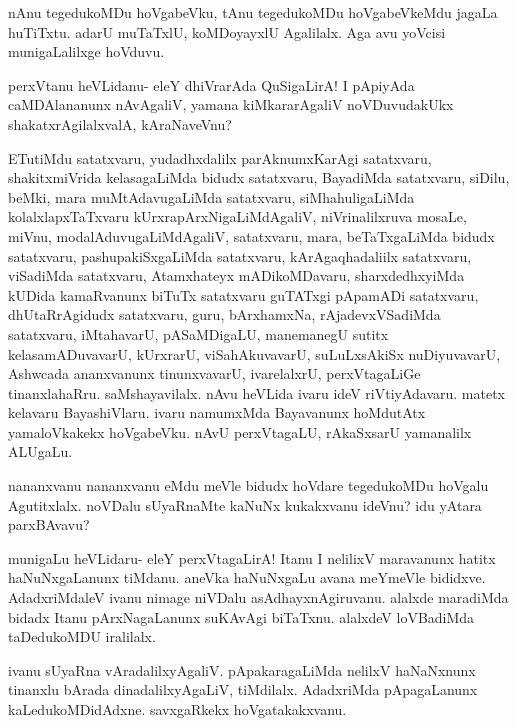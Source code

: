 \documentclass{article}
\begin{document}
\begin{mng}%
nAnu tegedukoMDu hoVgabeVku, tAnu tegedukoMDu hoVgabeVkeMdu jagaLa 
huTiTxtu. adarU muTaTxlU, koMDoyayxlU Agalilalx. Aga avu yoVcisi 
munigaLalilxge hoVduvu.
\end{mng}

\begin{mng}%
perxVtanu heVLidanu- eleY dhiVrarAda QuSigaLirA! I pApiyAda 
caMDAlananunx nAvAgaliV, yamana kiMkararAgaliV noVDuvudakUkx 
shakatxrAgilalxvalA, kAraNaveVnu?
\end{mng}

\begin{mng}%
ETutiMdu satatxvaru, yudadhxdalilx parAknumxKarAgi satatxvaru, 
shakitxmiVrida kelasagaLiMda bidudx satatxvaru, BayadiMda satatxvaru, 
siDilu, beMki, mara muMtAdavugaLiMda satatxvaru, siMhahuligaLiMda 
kolalxlapxTaTxvaru kUrxrapArxNigaLiMdAgaliV, niVrinalilxruva mosaLe, 
miVnu, modalAduvugaLiMdAgaliV, satatxvaru, mara, beTaTxgaLiMda bidudx 
satatxvaru, pashupakiSxgaLiMda satatxvaru, kArAgaqhadaliilx 
satatxvaru, viSadiMda satatxvaru, Atamxhateyx mADikoMDavaru, 
sharxdedhxyiMda kUDida kamaRvanunx biTuTx satatxvaru guTATxgi pApamADi 
satatxvaru, dhUtaRrAgidudx satatxvaru, guru, bArxhamxNa, 
rAjadevxVSadiMda satatxvaru, iMtahavarU, pASaMDigaLU, manemanegU 
sutitx kelasamADuvavarU, kUrxrarU, viSahAkuvavarU, suLuLxsAkiSx 
nuDiyuvavarU, Ashwcada ananxvanunx tinunxvavarU, ivarelalxrU, 
perxVtagaLiGe tinanxlahaRru. saMshayavilalx. nAvu heVLida ivaru ideV 
riVtiyAdavaru. matetx kelavaru BayashiVlaru. ivaru namumxMda 
Bayavanunx hoMdutAtx yamaloVkakekx hoVgabeVku. nAvU perxVtagaLU, 
rAkaSxsarU yamanalilx ALUgaLu.
\end{mng}

\begin{mng}%
nananxvanu nananxvanu eMdu meVle bidudx hoVdare tegedukoMDu hoVgalu 
Agutitxlalx. noVDalu sUyaRnaMte kaNuNx kukakxvanu ideVnu? idu yAtara 
parxBAvavu?
\end{mng}

\begin{mng}%
munigaLu heVLidaru- eleY perxVtagaLirA! Itanu I nelilixV maravanunx 
hatitx haNuNxgaLanunx tiMdanu. aneVka haNuNxgaLu avana meYmeVle 
bididxve. AdadxriMdaleV ivanu nimage niVDalu asAdhayxnAgiruvanu. 
alalxde maradiMda bidadx Itanu pArxNagaLanunx suKAvAgi biTaTxnu. 
alalxdeV loVBadiMda taDedukoMDU iralilalx.
\end{mng}

\begin{mng}%
ivanu sUyaRna vAradalilxyAgaliV. pApakaragaLiMda nelilxV haNaNxnunx 
tinanxlu bArada dinadalilxyAgaLiV, tiMdilalx. AdadxriMda pApagaLanunx 
kaLedukoMDidAdxne. savxgaRkekx hoVgatakakxvanu.
\end{mng}
\end{document}
